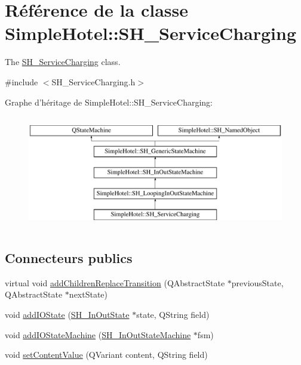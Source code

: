 \hypertarget{classSimpleHotel_1_1SH__ServiceCharging}{\section{Référence de la classe Simple\-Hotel\-:\-:S\-H\-\_\-\-Service\-Charging}
\label{classSimpleHotel_1_1SH__ServiceCharging}
}


The \hyperlink{classSimpleHotel_1_1SH__ServiceCharging}{S\-H\-\_\-\-Service\-Charging} class.  




{\ttfamily \#include $<$S\-H\-\_\-\-Service\-Charging.\-h$>$}

Graphe d'héritage de Simple\-Hotel\-:\-:S\-H\-\_\-\-Service\-Charging\-:\begin{figure}[H]
\begin{center}
\leavevmode
\includegraphics[height=5.000000cm]{classSimpleHotel_1_1SH__ServiceCharging}
\end{center}
\end{figure}
\subsection*{Connecteurs publics}
\begin{DoxyCompactItemize}
\item 
virtual void \hyperlink{classSimpleHotel_1_1SH__InOutStateMachine_a3339fd43658e6ac0979bd43014785766}{add\-Children\-Replace\-Transition} (Q\-Abstract\-State $\ast$previous\-State, Q\-Abstract\-State $\ast$next\-State)
\item 
void \hyperlink{classSimpleHotel_1_1SH__InOutStateMachine_a07ae9f1f74a9a41b26e77a014679a33e}{add\-I\-O\-State} (\hyperlink{classSimpleHotel_1_1SH__InOutState}{S\-H\-\_\-\-In\-Out\-State} $\ast$state, Q\-String field)
\item 
void \hyperlink{classSimpleHotel_1_1SH__InOutStateMachine_a27a59a44e0bcddf90d40b38788bb38f4}{add\-I\-O\-State\-Machine} (\hyperlink{classSimpleHotel_1_1SH__InOutStateMachine}{S\-H\-\_\-\-In\-Out\-State\-Machine} $\ast$fsm)
\item 
void \hyperlink{classSimpleHotel_1_1SH__InOutStateMachine_aaf92da452f6cf7cc57aa9e60f88322e4}{set\-Content\-Value} (Q\-Variant content, Q\-String field)
\end{DoxyCompactItemize}
